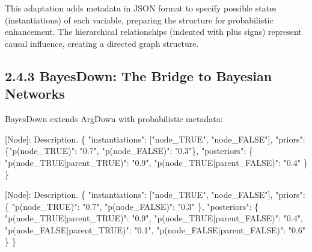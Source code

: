 \documentclass[
  11pt,
  letterpaper,
]{book}
\newenvironment{Shaded}{\begin{snugshade}}{\end{snugshade}}
\newcommand{\DataTypeTok}[1]{\textcolor[rgb]{0.68,0.00,0.00}{#1}}
\newcommand{\ErrorTok}[1]{\textcolor[rgb]{0.68,0.00,0.00}{#1}}
\newcommand{\FunctionTok}[1]{\textcolor[rgb]{0.28,0.35,0.67}{#1}}
\newcommand{\OtherTok}[1]{\textcolor[rgb]{0.00,0.23,0.31}{#1}}
\newcommand{\StringTok}[1]{\textcolor[rgb]{0.13,0.47,0.30}{#1}}
\begin{document}
This adaptation adds metadata in JSON format to specify possible states
(instantiations) of each variable, preparing the structure for
probabilistic enhancement. The hierarchical relationships (indented with
plus signs) represent causal influence, creating a directed graph
structure.

\subsection*{2.4.3 BayesDown: The Bridge to Bayesian
Networks}\label{sec-bayesdown}

BayesDown extends ArgDown with probabilistic metadata:

\begin{Shaded}
\begin{Highlighting}[]
\OtherTok{[}\ErrorTok{Node}\OtherTok{]}\ErrorTok{:} \ErrorTok{Description.} \FunctionTok{\{}
  \DataTypeTok{"instantiations"}\FunctionTok{:} \OtherTok{[}\StringTok{"node\_TRUE"}\OtherTok{,} \StringTok{"node\_FALSE"}\OtherTok{]}\FunctionTok{,}
  \DataTypeTok{"priors"}\FunctionTok{:} \FunctionTok{\{}\DataTypeTok{"p(node\_TRUE)"}\FunctionTok{:} \StringTok{"0.7"}\FunctionTok{,} \DataTypeTok{"p(node\_FALSE)"}\FunctionTok{:} \StringTok{"0.3"}\FunctionTok{\},}
  \DataTypeTok{"posteriors"}\FunctionTok{:} \FunctionTok{\{}
    \DataTypeTok{"p(node\_TRUE|parent\_TRUE)"}\FunctionTok{:} \StringTok{"0.9"}\FunctionTok{,}
    \DataTypeTok{"p(node\_TRUE|parent\_FALSE)"}\FunctionTok{:} \StringTok{"0.4"}
  \FunctionTok{\}}
\FunctionTok{\}}
\end{Highlighting}
\end{Shaded}

\begin{Shaded}
\begin{Highlighting}[]
\OtherTok{[}\ErrorTok{Node}\OtherTok{]}\ErrorTok{:} \ErrorTok{Description.} \FunctionTok{\{}
  \DataTypeTok{"instantiations"}\FunctionTok{:} \OtherTok{[}\StringTok{"node\_TRUE"}\OtherTok{,} \StringTok{"node\_FALSE"}\OtherTok{]}\FunctionTok{,}
  \DataTypeTok{"priors"}\FunctionTok{:} \FunctionTok{\{}
    \DataTypeTok{"p(node\_TRUE)"}\FunctionTok{:} \StringTok{"0.7"}\FunctionTok{,}
    \DataTypeTok{"p(node\_FALSE)"}\FunctionTok{:} \StringTok{"0.3"}
  \FunctionTok{\},}
  \DataTypeTok{"posteriors"}\FunctionTok{:} \FunctionTok{\{}
    \DataTypeTok{"p(node\_TRUE|parent\_TRUE)"}\FunctionTok{:} \StringTok{"0.9"}\FunctionTok{,}
    \DataTypeTok{"p(node\_TRUE|parent\_FALSE)"}\FunctionTok{:} \StringTok{"0.4"}\FunctionTok{,}
    \DataTypeTok{"p(node\_FALSE|parent\_TRUE)"}\FunctionTok{:} \StringTok{"0.1"}\FunctionTok{,}
    \DataTypeTok{"p(node\_FALSE|parent\_FALSE)"}\FunctionTok{:} \StringTok{"0.6"}
  \FunctionTok{\}}
\FunctionTok{\}}
\end{Highlighting}
\end{Shaded}
\end{document}
